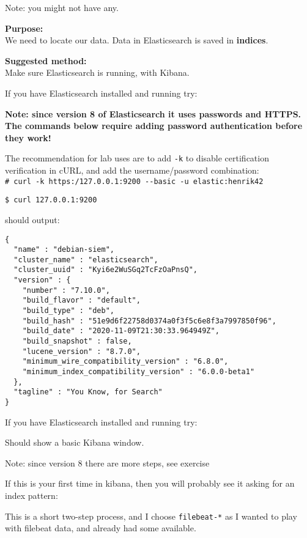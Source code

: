 \documentclass[a4paper,11pt,notitlepage]{report}
\begin{document}
Note: you might not have any.

{\bf Purpose:}\\
We need to locate our data. Data in Elasticsearch is saved in {\bf indices}.


{\bf Suggested method:}\\
Make sure Elasticsearch is running, with Kibana.

If you have Elasticsearch installed and running try: 

{\bf Note: since version 8 of Elasticsearch it uses passwords and HTTPS. The commands below require adding password authentication before they work!}

The recommendation for lab uses are to add \verb+-k+ to disable certification verification in cURL, and add the username/password combination:\\
\verb+# curl -k https:/127.0.0.1:9200 --basic -u elastic:henrik42+

\begin{verbatim}
$ curl 127.0.0.1:9200
\end{verbatim}
should output:
\begin{verbatim}
{
  "name" : "debian-siem",
  "cluster_name" : "elasticsearch",
  "cluster_uuid" : "Kyi6e2WuSGq2TcFzOaPnsQ",
  "version" : {
    "number" : "7.10.0",
    "build_flavor" : "default",
    "build_type" : "deb",
    "build_hash" : "51e9d6f22758d0374a0f3f5c6e8f3a7997850f96",
    "build_date" : "2020-11-09T21:30:33.964949Z",
    "build_snapshot" : false,
    "lucene_version" : "8.7.0",
    "minimum_wire_compatibility_version" : "6.8.0",
    "minimum_index_compatibility_version" : "6.0.0-beta1"
  },
  "tagline" : "You Know, for Search"
}
\end{verbatim}


If you have Elasticsearch installed and running try: 

Should show a basic Kibana window.

Note: since version 8 there are more steps, see exercise 


If this is your first time in kibana, then you will probably see it asking for an index pattern:

This is a short two-step process, and I choose \verb+filebeat-*+ as I wanted to play with filebeat data, and already had some available.
\end{document}
